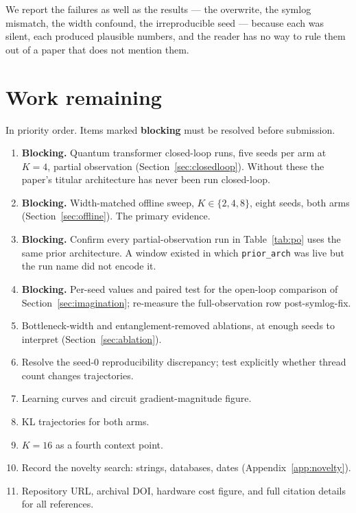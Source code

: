 \documentclass[11pt]{article}
\begin{document}
We report the failures as well as the results --- the overwrite, the
symlog mismatch, the width confound, the irreproducible seed --- because
each was silent, each produced plausible numbers, and the reader has no
way to rule them out of a paper that does not mention them.

\appendix
\section{Work remaining}\label{app:remaining}
In priority order. Items marked \textbf{blocking} must be resolved
before submission.

\begin{enumerate}\itemsep3pt
\item \textbf{Blocking.} Quantum transformer closed-loop runs, five
      seeds per arm at $K = 4$, partial observation
      (Section~\ref{sec:closedloop}). Without these the paper's titular
      architecture has never been run closed-loop.
\item \textbf{Blocking.} Width-matched offline sweep, $K \in \{2,4,8\}$,
      eight seeds, both arms (Section~\ref{sec:offline}). The primary
      evidence.
\item \textbf{Blocking.} Confirm every partial-observation run in
      Table~\ref{tab:po} uses the same prior architecture. A window
      existed in which \texttt{prior\_arch} was live but the run name
      did not encode it.
\item \textbf{Blocking.} Per-seed values and paired test for the
      open-loop comparison of Section~\ref{sec:imagination}; re-measure
      the full-observation row post-symlog-fix.
\item Bottleneck-width and entanglement-removed ablations, at enough
      seeds to interpret (Section~\ref{sec:ablation}).
\item Resolve the seed-$0$ reproducibility discrepancy; test explicitly
      whether thread count changes trajectories.
\item Learning curves and circuit gradient-magnitude figure.
\item KL trajectories for both arms.
\item $K = 16$ as a fourth context point.
\item Record the novelty search: strings, databases, dates
      (Appendix~\ref{app:novelty}).
\item Repository URL, archival DOI, hardware cost figure, and full
      citation details for all references.
\end{enumerate}
\end{document}
